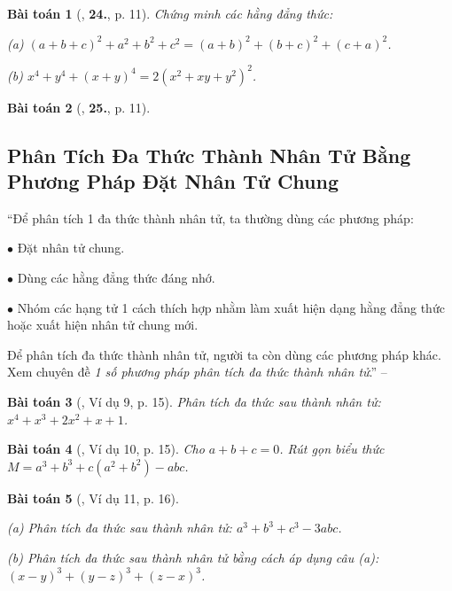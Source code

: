 \documentclass{article}
\numberwithin{equation}{section}
\newtheorem{baitoan}{Bài toán}[section]
\begin{document}
\begin{baitoan}[\cite{Binh_Toan_8_tap_1}, \textbf{24.}, p. 11]
	Chứng minh các hằng đẳng thức:
	\begin{enumerate*}
		\item[(a)] $(a + b + c)^2 + a^2 + b^2 + c^2 = (a + b)^2 + (b + c)^2 + (c + a)^2$.
		\item[(b)] $x^4 + y^4 + (x + y)^4 = 2(x^2 + xy + y^2)^2$.
	\end{enumerate*}
\end{baitoan}

\begin{baitoan}[\cite{Binh_Toan_8_tap_1}, \textbf{25.}, p. 11]
	
\end{baitoan}


\newpage
\subsection{Phân Tích Đa Thức Thành Nhân Tử Bằng Phương Pháp Đặt Nhân Tử Chung}
``Để phân tích 1 đa thức thành nhân tử, ta thường dùng các phương pháp:
\begin{enumerate*}
	\item[$\bullet$] Đặt nhân tử chung.
	\item[$\bullet$] Dùng các hằng đẳng thức đáng nhớ.
	\item[$\bullet$] Nhóm các hạng tử 1 cách thích hợp nhằm làm xuất hiện dạng hằng đẳng thức hoặc xuất hiện nhân tử chung mới.
\end{enumerate*}
Để phân tích đa thức thành nhân tử, người ta còn dùng các phương pháp khác. Xem chuyên đề \textit{1 số phương pháp phân tích đa thức thành nhân tử}.'' -- \cite[p. 15]{Binh_Toan_8_tap_1}

\begin{baitoan}[\cite{Binh_Toan_8_tap_1}, Ví dụ 9, p. 15]
	Phân tích đa thức sau thành nhân tử: 	$x^4 + x^3 + 2x^2 + x + 1$.
\end{baitoan}

\begin{baitoan}[\cite{Binh_Toan_8_tap_1}, Ví dụ 10, p. 15]
	Cho $a + b + c = 0$. Rút gọn biểu thức $M = a^3 + b^3 + c(a^2 + b^2) - abc$.
\end{baitoan}

\begin{baitoan}[\cite{Binh_Toan_8_tap_1}, Ví dụ 11, p. 16]
	\begin{enumerate*}
		\item[(a)] Phân tích đa thức sau thành nhân tử: $a^3 + b^3 + c^3 - 3abc$.
		\item[(b)] Phân tích đa thức sau thành nhân tử bằng cách áp dụng câu (a): $(x - y)^3 + (y - z)^3 + (z - x)^3$.
	\end{enumerate*}
\end{baitoan}
\end{document}
